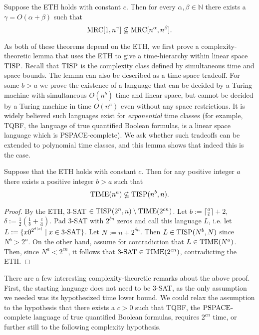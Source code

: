 \begin{theorem} \label{thm:timehierarchy}
Suppose the ETH holds with constant $c$. Then for every $\alpha,\beta\in\mathbb N$
there exists a $\gamma = O(\alpha + \beta)$ such that $$\textup{MRC}[1, n^\gamma]
\not\subseteq \textup{MRC}[n^\alpha, n^\beta].$$
\end{theorem}

As both of these theorems depend on the ETH, we first prove a complexity-theoretic
lemma that uses the ETH to give a time-hierarchy within linear space $\textup{TISP}$.
Recall that $\textup{TISP}$ is the complexity class defined by simultaneous time and 
space bounds.
The lemma can also be described as a time-space tradeoff.
For some $b > a$ we prove
the existence of a language that can be decided by a Turing machine with
simultaneous $O(n^b)$ time and linear space, but cannot be decided by a Turing
machine in time $O(n^a)$ even without any space restrictions. It is widely
believed such languages exist for \emph{exponential} time classes (for example,
TQBF, the language of true quantified Boolean formulas, is a linear space
language which is PSPACE-complete). We ask whether such tradeoffs can be
extended to polynomial time classes, and this lemma shows that indeed this is
the case.

\begin{lemma}\label{lemma:eth} Suppose that the ETH holds with constant $c$. Then
for any positive integer $a$ there exists a positive integer $b>a$ such that
$$\textup{TIME}(n^a) \nsubseteq \textup{TISP}(n^b, n).$$ \end{lemma}

\begin{proof}
By the ETH, 3-SAT $\in \textup{TISP}(2^n, n)\setminus \textup{TIME}(2^{cn})$. Let
$b:=\lceil\frac{a}{c}\rceil+2$, $\delta:=\frac12(\frac1b+\frac{c}{a})$. Pad
3-SAT with $2^{\delta n}$ zeros and call this language $L$, i.e. let $L:=\{x
0^{2^{\delta|x|}} \mid x \in \textup{3-SAT}\}$. Let $N:=n+2^{\delta n}$. Then
$L\in \textup{TISP}(N^b, N)$ since $N^b > 2^n$. On the other hand, assume for
contradiction that $L \in \textup{TIME}(N^a)$. Then, since $N^a < 2^{cn}$, it follows
that $\textup{3-SAT} \in \textup{TIME}(2^{cn})$, contradicting the ETH.
\end{proof}

There are a few interesting complexity-theoretic remarks about the above proof.
First, the starting language does not need to be 3-SAT, as the only assumption
we needed was its hypothesized time lower bound.  We could relax the assumption
to the hypothesis that there exists a $c>0$ such that TQBF,
the $\textup{PSPACE}$-complete language of true quantified Boolean formulas,
requires $2^{cn}$ time, or further still to the following complexity hypothesis.

